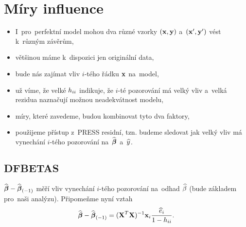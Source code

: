 \section{Míry influence}
\begin{itemize}
	\item I~pro~perfektní model mohou dva různé vzorky $(\mathbf{x},\mathbf{y})$ a~$(\mathbf{x}',\mathbf{y}')$ vést k~různým závěrům,
	\item většinou máme k~dispozici jen originální data,
	\item bude nás zajímat vliv $i$-tého řádku $\mathbf{x}$ na~model,
	\item už víme, že velké $h_{ii}$ indikuje, že $i$-té pozorování má velký vliv a~velká rezidua naznačují možnou neadekvátnost modelu,
	\item míry, které zavedeme, budou kombinovat tyto dva faktory,
	\item použijeme přístup z~PRESS residní, tzn. budeme sledovat jak velký vliv má vynechání $i$-tého pozorování na~$\widehat{\boldsymbol{\beta}}$ a~$\widehat{y}$.
\end{itemize}
\subsection*{DFBETAS}
 $\widehat{\boldsymbol{\beta}}-{\widehat{\boldsymbol{\beta}}_{(-1)}}$ měří vliv vynechání $i$-tého pozorování na~odhad $\widehat{\beta}$ (bude základem pro~naši analýzu). Připomeňme nyní vztah
 $$ \widehat{\boldsymbol{\beta}}-{\widehat{\boldsymbol{\beta}}_{(-1)}} = {(\textbf{X}^T\textbf{X})^{-1}} \mathbf{x}_i\frac{\widehat{e}_i}{1-h_{ii}}. $$


